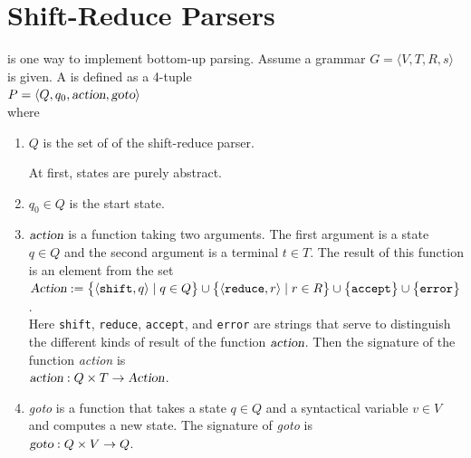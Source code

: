 \section{Shift-Reduce Parsers}
 is one way to implement bottom-up parsing.
Assume a grammar $G = \langle V, T, R, s \rangle$ is given.  A  
is defined as a 4-tuple
\\[0.2cm]
\hspace*{1.3cm}
$P = \langle Q, q_0, \textsl{action}, \textsl{goto} \rangle$
\\[0.2cm]
where
\begin{enumerate}
\item $Q$ is the set of  of the shift-reduce parser.  

      At first, states are purely abstract. 
\item $q_0 \in Q$ is the start state.
\item $\textsl{action}$ is a function taking two arguments. The first argument is a state $q \in Q$
      and the second argument is a terminal $t \in T$.  The result of this function is an element from the set
      \\[0.2cm]
      \hspace*{1.3cm}
      $\textsl{Action} :=
       \bigl\{ \pair(\texttt{shift}, q)  \mid q \in Q \bigr\}               \cup 
       \bigl\{ \pair(\texttt{reduce}, r) \mid r \in R \bigr\} \cup 
       \bigl\{ \texttt{accept} \bigr\}                        \cup
       \bigl\{ \texttt{error}  \bigr\}                         $.
      \\[0.2cm]
      Here \texttt{shift}, \texttt{reduce}, \texttt{accept}, and \texttt{error} are strings that serve to
      distinguish the different kinds of result of the function 
      $\textsl{action}$.  Then the signature of the function \textsl{action} is
      \\[0.2cm]
      \hspace*{1.3cm}
      $\textsl{action}: Q \times T \rightarrow \textsl{Action}$.
\item \textsl{goto} is a function that takes a state $q \in Q$ and a syntactical variable
      $v \in V$ and computes a new state.  The signature of \textsl{goto} is 
      \\[0.2cm]
      \hspace*{1.3cm}
      $\textsl{goto}: Q \times V \rightarrow Q$.
\end{enumerate}
